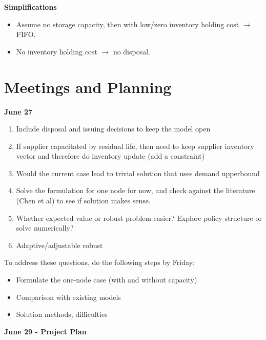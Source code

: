 \documentclass{article}
\newcommand{\pa}[1]{\noindent\textbf{\textsf{#1}}}
\begin{document}
\pa{Simplifications}

\begin{itemize}
\item Assume no storage capacity, then with low/zero inventory holding cost $\rightarrow$ FIFO.
\item No inventory holding cost $\rightarrow$ no disposal.
\end{itemize}

\pagebreak

\section*{\textsf{Meetings and Planning}}

\pa{June 27}

\begin{enumerate}
\item Include disposal and issuing decisions to keep the model open
\item If supplier capacitated by residual life, then need to keep supplier inventory vector and therefore do inventory update (add a constraint)
\item Would the current case lead to trivial solution that uses demand upperbound
\item Solve the formulation for one node for now, and check against the literature (Chen et al) to see if solution makes sense.
\item Whether expected value or robust problem easier? Explore policy structure or solve numerically?
\item Adaptive/adjustable robust 
\end{enumerate}

To address these questions, do the following steps by Friday:
\begin{itemize}
\item Formulate the one-node case (with and without capacity)
\item Comparison with existing models
\item Solution methods, difficulties
\end{itemize}


\pa{June 29 - Project Plan}
\end{document}
